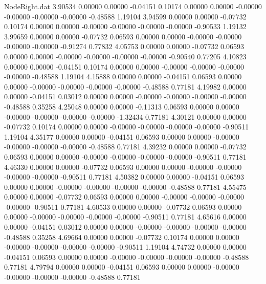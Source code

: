 \begin{filecontents}{NodeRight.dat}
   3.90534    0.00000    0.00000    -0.04151    0.10174    0.00000    0.00000   -0.00000   -0.00000   -0.00000   -0.00000   -0.48588    1.19104
   3.94599    0.00000    0.00000    -0.07732    0.10174    0.00000    0.00000   -0.00000   -0.00000   -0.00000   -0.00000   -0.90533    1.19132
   3.99659    0.00000    0.00000    -0.07732    0.06593    0.00000    0.00000   -0.00000   -0.00000   -0.00000   -0.00000   -0.91274    0.77832
   4.05753    0.00000    0.00000    -0.07732    0.06593    0.00000    0.00000   -0.00000   -0.00000   -0.00000   -0.00000   -0.90540    0.77205
   4.10823    0.00000    0.00000    -0.04151    0.10174    0.00000    0.00000   -0.00000   -0.00000   -0.00000   -0.00000   -0.48588    1.19104
   4.15888    0.00000    0.00000    -0.04151    0.06593    0.00000    0.00000   -0.00000   -0.00000   -0.00000   -0.00000   -0.48588    0.77181
   4.19982    0.00000    0.00000    -0.04151    0.03012    0.00000    0.00000   -0.00000   -0.00000   -0.00000   -0.00000   -0.48588    0.35258
   4.25048    0.00000    0.00000    -0.11313    0.06593    0.00000    0.00000   -0.00000   -0.00000   -0.00000   -0.00000   -1.32434    0.77181
   4.30121    0.00000    0.00000    -0.07732    0.10174    0.00000    0.00000   -0.00000   -0.00000   -0.00000   -0.00000   -0.90511    1.19104
   4.35177    0.00000    0.00000    -0.04151    0.06593    0.00000    0.00000   -0.00000   -0.00000   -0.00000   -0.00000   -0.48588    0.77181
   4.39232    0.00000    0.00000    -0.07732    0.06593    0.00000    0.00000   -0.00000   -0.00000   -0.00000   -0.00000   -0.90511    0.77181
   4.46330    0.00000    0.00000    -0.07732    0.06593    0.00000    0.00000   -0.00000   -0.00000   -0.00000   -0.00000   -0.90511    0.77181
   4.50382    0.00000    0.00000    -0.04151    0.06593    0.00000    0.00000   -0.00000   -0.00000   -0.00000   -0.00000   -0.48588    0.77181
   4.55475    0.00000    0.00000    -0.07732    0.06593    0.00000    0.00000   -0.00000   -0.00000   -0.00000   -0.00000   -0.90511    0.77181
   4.60533    0.00000    0.00000    -0.07732    0.06593    0.00000    0.00000   -0.00000   -0.00000   -0.00000   -0.00000   -0.90511    0.77181
   4.65616    0.00000    0.00000    -0.04151    0.03012    0.00000    0.00000   -0.00000   -0.00000   -0.00000   -0.00000   -0.48588    0.35258
   4.69664    0.00000    0.00000    -0.07732    0.10174    0.00000    0.00000   -0.00000   -0.00000   -0.00000   -0.00000   -0.90511    1.19104
   4.74732    0.00000    0.00000    -0.04151    0.06593    0.00000    0.00000   -0.00000   -0.00000   -0.00000   -0.00000   -0.48588    0.77181
   4.79794    0.00000    0.00000    -0.04151    0.06593    0.00000    0.00000   -0.00000   -0.00000   -0.00000   -0.00000   -0.48588    0.77181

\end{filecontents}
